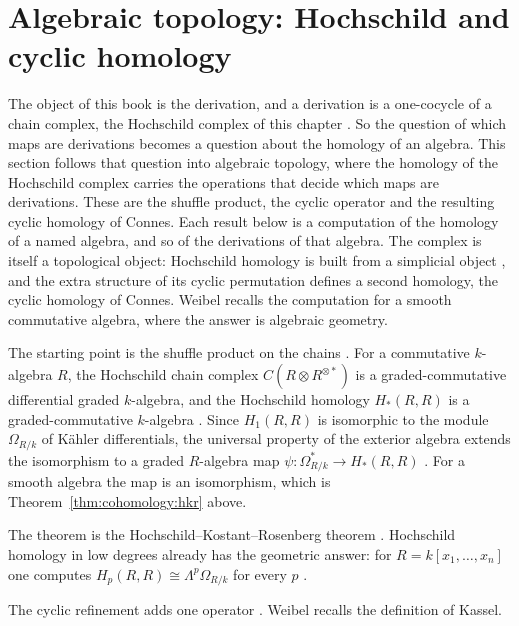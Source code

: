 \section{Algebraic topology: Hochschild and cyclic homology}\label{sec:cohomology:algebraic-topology}

The object of this book is the derivation, and a derivation is a one-cocycle of
a chain complex, the Hochschild complex of this
chapter \cite[\S9.6]{Weibel1994}. So the question of which maps are
derivations becomes a question about the homology of an algebra. This section
follows that question into algebraic topology, where the homology of the
Hochschild complex carries the operations that decide which maps are
derivations. These are the shuffle
product, the cyclic operator and the resulting cyclic homology of Connes. Each
result
below is a computation of the homology of a named algebra, and so of the
derivations of that algebra. %
The complex is
itself a topological object: Hochschild homology is built from a simplicial
object \cite[\S9.6]{Weibel1994}, and the extra structure of its cyclic
permutation defines a second homology, the cyclic homology of Connes. Weibel
recalls the computation for a smooth commutative algebra, where the answer is
algebraic geometry.

The starting point is the shuffle product on the chains
\cite[\S9.4.1]{Weibel1994}. For a commutative $k$-algebra $R$, the Hochschild
chain complex $C(R\otimes R^{\otimes\ast})$ is a graded-commutative
differential graded $k$-algebra, and the Hochschild homology $H_*(R,R)$ is a
graded-commutative $k$-algebra \cite[Proposition~9.4.2, p.~321]{Weibel1994}.
Since $H_1(R,R)$ is isomorphic to the module $\Omega_{R/k}$ of K\"ahler
differentials, the universal property of the exterior algebra extends the
isomorphism to a graded $R$-algebra map $\psi\colon\Omega^*_{R/k}\to H_*(R,R)$
\cite[Corollary~9.4.4, p.~322]{Weibel1994}. For a smooth algebra the map is an
isomorphism, which is Theorem~\ref{thm:cohomology:hkr} above.

The theorem is the Hochschild--Kostant--Rosenberg theorem
\cite[9.4.7]{Weibel1994}. Hochschild homology in low degrees already has the
geometric answer: for $R=k[x_1,\ldots,x_n]$ one computes $H_p(R,R)\cong
\Lambda^p\Omega_{R/k}$ for every $p$ \cite[Exercise~9.1.3,
p.~304]{Weibel1994}.

The cyclic refinement adds one operator \cite[\S9.8]{Weibel1994}. Weibel
recalls the definition of Kassel.

